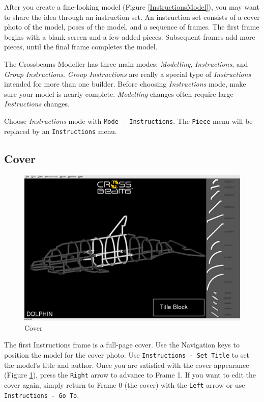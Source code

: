 \documentclass[12pt]{report}
\begin{document}
After you create a fine-looking model (Figure
\ref{InstructionsModel}), you may want to share the idea through an
instruction set.  An instruction set consists of a cover photo of the
model, poses of the model, and a sequence of frames.  The first frame
begins with a blank screen and a few added pieces.  Subsequent frames
add more pieces, until the final frame completes the model.

The Crossbeams Modeller has three main modes: \emph{Modelling},
\emph{Instructions}, and \emph{Group Instructions}.  \emph{Group
  Instructions} are really a special type of \emph{Instructions}
intended for more than one builder.  Before choosing
\emph{Instructions} mode, make sure your model is nearly complete.
\emph{Modelling} changes often require large \emph{Instructions}
changes.

Choose \emph{Instructions} mode with {\tt Mode - Instructions}.  The
{\tt Piece} menu will be replaced by an {\tt Instructions} menu.

\subsection{Cover}

\begin{figure}[h]
\begin{center}
\includegraphics[width=6.38in]{doc_images/manual_instructions_cover.png}
\caption{Cover}
\label{InstructionsCover}
\end{center}
\end{figure}

The first Instructions frame is a full-page cover.  Use the Navigation
keys to position the model for the cover photo.  Use {\tt Instructions
  - Set Title} to set the model's title and author.  Once you are
satisfied with the cover appearance (Figure \ref{InstructionsCover}),
press the {\tt Right} arrow to advance to Frame 1.  If you want to
edit the cover again, simply return to Frame 0 (the cover) with the
{\tt Left} arrow or use {\tt Instructions - Go To}.
\end{document}
